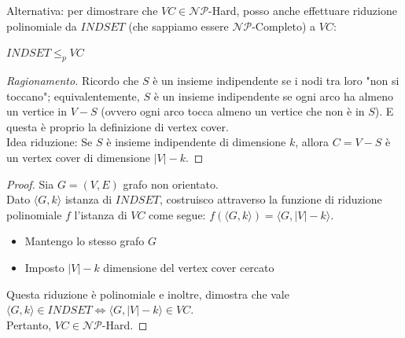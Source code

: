 \documentclass{article}  %
\theoremstyle{definition}
\newenvironment{ragionamento}[1][]
  {\begin{proof}[Ragionamento#1]\renewcommand{\qedsymbol}{}\normalfont}
  {\end{proof}}
\begin{document}
\begin{osservazioni}
	\footnotesize
	Alternativa: per dimostrare che $VC \in \mathcal{NP}$-Hard, posso anche effettuare riduzione polinomiale da $INDSET$ (che sappiamo essere $\mathcal{NP}$-Completo) a $VC$:
	\begin{center}
		$INDSET \leq_p VC$
	\end{center}
	\begin{ragionamento}
		Ricordo che $S$ è un insieme indipendente se i nodi tra loro "non si toccano"; equivalentemente, $S$ è un insieme indipendente se ogni arco ha almeno un vertice
		in $V-S$ (ovvero ogni arco tocca almeno un vertice che non è in $S$). E questa è proprio la definizione di vertex cover. \\
		Idea riduzione: Se $S$ è insieme indipendente di dimensione $k$, allora $C=V-S$ è un vertex cover di dimensione $|V|-k$.
	\end{ragionamento}
	\begin{proof}
		Sia $G=(V,E)$ grafo non orientato. \\
		Dato $\langle G,k \rangle$ istanza di $INDSET$, costruisco attraverso la funzione di riduzione polinomiale $f$ l'istanza di $VC$ come segue:
		$f(\langle G,k \rangle)=\langle G, |V|-k \rangle$.
		\begin{itemize}
			\item Mantengo lo stesso grafo $G$
			\item Imposto $|V|-k$ dimensione del vertex cover cercato
		\end{itemize}
		Questa riduzione è polinomiale e inoltre, dimostra che vale $\langle G,k \rangle \in INDSET \iff \langle G,|V|-k \rangle \in VC$. \\
		Pertanto, $VC \in \mathcal{NP}$-Hard.
	\end{proof}
\end{osservazioni}
\break
\end{document}

